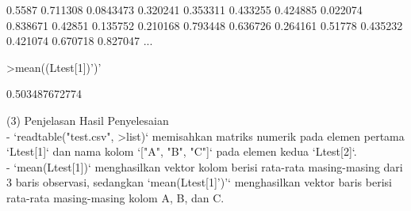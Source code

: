\documentclass{article}
\newenvironment{eulernotebook}{\par}{\par}
\newenvironment{eulercomment}{\par\medskip}{\par\medskip}
\begin{document}
\begin{eulernotebook}
\begin{eulercomment}
\begin{eulercomment}
\begin{eulercomment}
\begin{eulercomment}
\begin{eulercomment}
\begin{eulercomment}
\begin{euleroutput}
         0.5587 
       0.711308 
      0.0843473 
       0.320241 
       0.353311 
       0.433255 
       0.424885 
       0.022074 
       0.838671 
        0.42851 
       0.135752 
       0.210168 
       0.793448 
       0.636726 
       0.264161 
        0.51778 
       0.435232 
       0.421074 
       0.670718 
       0.827047 
      ...
\end{euleroutput}
\begin{eulerprompt}
>mean((Ltest[1])')'
\end{eulerprompt}
\begin{euleroutput}
  0.503487672774
\end{euleroutput}
\begin{eulercomment}
(3) Penjelasan Hasil Penyelesaian \\
- `readtable("test.csv", \textgreater{}list)` memisahkan matriks numerik pada
elemen pertama `Ltest[1]` dan nama kolom `["A", "B", "C"]` pada elemen
kedua `Ltest[2]`. \\
- `mean(Ltest[1])` menghasilkan vektor kolom berisi rata-rata
masing-masing dari 3 baris observasi, sedangkan `mean(Ltest[1]')'`
menghasilkan vektor baris berisi rata-rata masing-masing kolom A, B,
dan C.
\end{eulercomment}
\end{eulernotebook}
\end{document}

